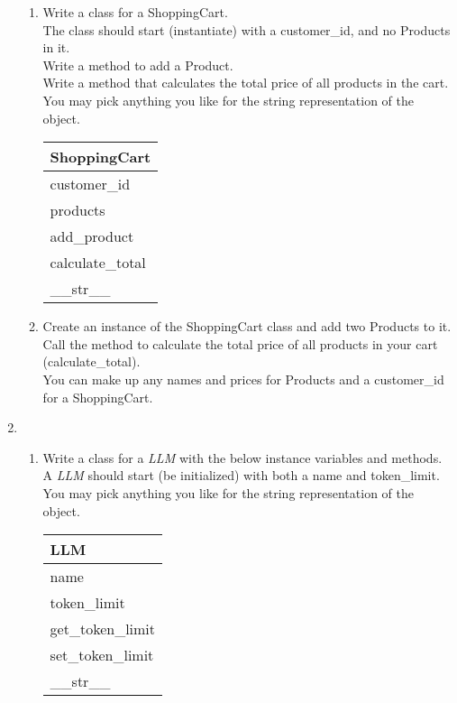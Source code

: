 \documentclass{article}
\begin{document}
\begin{enumerate}
\begin{enumerate}
		\item
			Write a class for a ShoppingCart. \\
			The class should start (instantiate) with a customer\_id, and no Products in it. \\ 
			Write a method to add a Product.\\
			Write a method that calculates the total price of all products in the cart.\\
			You may pick anything you like for the string representation of the object.
	
			\begin{flushright}
			\begin{tabular}{|l|}
				\hline
				ShoppingCart\\ \hline  	%
				customer\_id \\ products\\ \hline		%
				add\_product \\ calculate\_total \\ \_\_str\_\_ \\ \hline		%
			\end{tabular}
			\end{flushright}

		\item
			Create an instance of the ShoppingCart class and add two Products to it.\\
			Call the method to calculate the total price of all products in your cart (calculate\_total).\\
			You can make up any names and prices for Products and a customer\_id for a ShoppingCart.\\
	\end{enumerate}
\pagebreak



	\item 
	\begin{enumerate}
		\item 
			Write a class for a \textit{LLM} with the below instance variables and methods.\\
			A \textit{LLM} should start (be initialized) with both a name and token\_limit.\\
			You may pick anything you like for the string representation of the object.
			\begin{flushright}
			\begin{tabular}{|l|} \hline
				LLM\\ \hline
				name\\ token\_limit\\ \hline
				get\_token\_limit \\ set\_token\_limit \\ \_\_str\_\_ \\ \hline
			\end{tabular}
			\end{flushright}
		

\end{enumerate}
\end{enumerate}
\end{document}
